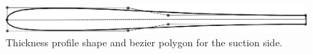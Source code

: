 \begin{figure}[h!]
\centering
\includegraphics[width=150mm]{param8.eps} 
\caption{Thickness profile shape and bezier polygon for the suction side.}
\label{param8}
\end{figure}



\begin{figure}[h!]
\begin{minipage}[b]{0.5\linewidth}
 \centering
\end{minipage}
\begin{minipage}[b]{0.5\linewidth}
 \centering

\end{minipage}
\end{figure}
